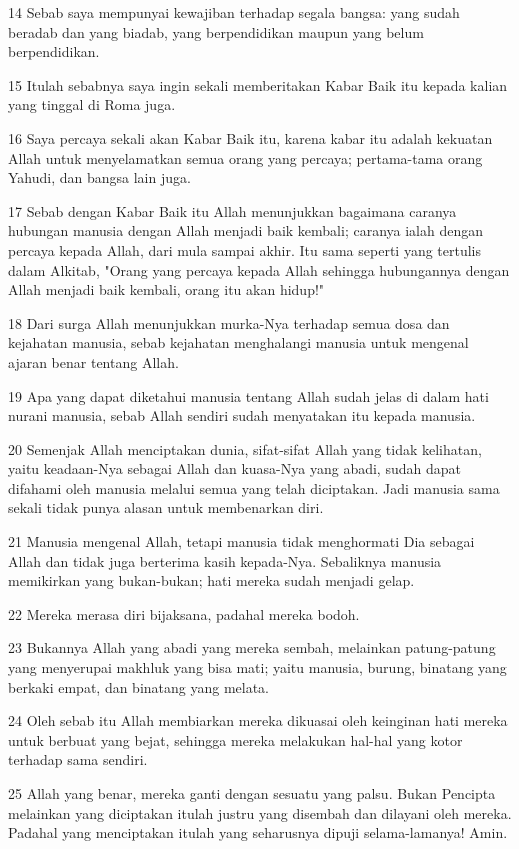 \par 14 Sebab saya mempunyai kewajiban terhadap segala bangsa: yang sudah beradab dan yang biadab, yang berpendidikan maupun yang belum berpendidikan.
\par 15 Itulah sebabnya saya ingin sekali memberitakan Kabar Baik itu kepada kalian yang tinggal di Roma juga.
\par 16 Saya percaya sekali akan Kabar Baik itu, karena kabar itu adalah kekuatan Allah untuk menyelamatkan semua orang yang percaya; pertama-tama orang Yahudi, dan bangsa lain juga.
\par 17 Sebab dengan Kabar Baik itu Allah menunjukkan bagaimana caranya hubungan manusia dengan Allah menjadi baik kembali; caranya ialah dengan percaya kepada Allah, dari mula sampai akhir. Itu sama seperti yang tertulis dalam Alkitab, "Orang yang percaya kepada Allah sehingga hubungannya dengan Allah menjadi baik kembali, orang itu akan hidup!"
\par 18 Dari surga Allah menunjukkan murka-Nya terhadap semua dosa dan kejahatan manusia, sebab kejahatan menghalangi manusia untuk mengenal ajaran benar tentang Allah.
\par 19 Apa yang dapat diketahui manusia tentang Allah sudah jelas di dalam hati nurani manusia, sebab Allah sendiri sudah menyatakan itu kepada manusia.
\par 20 Semenjak Allah menciptakan dunia, sifat-sifat Allah yang tidak kelihatan, yaitu keadaan-Nya sebagai Allah dan kuasa-Nya yang abadi, sudah dapat difahami oleh manusia melalui semua yang telah diciptakan. Jadi manusia sama sekali tidak punya alasan untuk membenarkan diri.
\par 21 Manusia mengenal Allah, tetapi manusia tidak menghormati Dia sebagai Allah dan tidak juga berterima kasih kepada-Nya. Sebaliknya manusia memikirkan yang bukan-bukan; hati mereka sudah menjadi gelap.
\par 22 Mereka merasa diri bijaksana, padahal mereka bodoh.
\par 23 Bukannya Allah yang abadi yang mereka sembah, melainkan patung-patung yang menyerupai makhluk yang bisa mati; yaitu manusia, burung, binatang yang berkaki empat, dan binatang yang melata.
\par 24 Oleh sebab itu Allah membiarkan mereka dikuasai oleh keinginan hati mereka untuk berbuat yang bejat, sehingga mereka melakukan hal-hal yang kotor terhadap sama sendiri.
\par 25 Allah yang benar, mereka ganti dengan sesuatu yang palsu. Bukan Pencipta melainkan yang diciptakan itulah justru yang disembah dan dilayani oleh mereka. Padahal yang menciptakan itulah yang seharusnya dipuji selama-lamanya! Amin.
